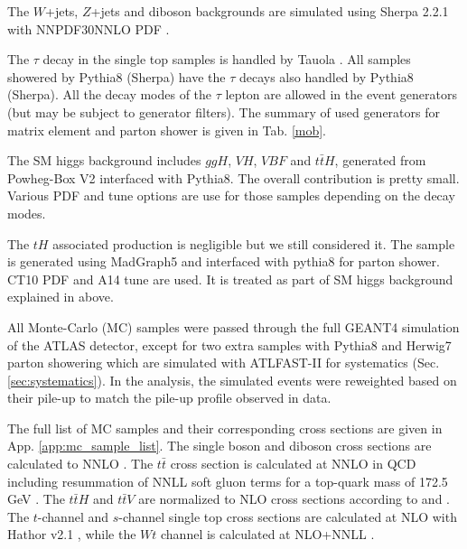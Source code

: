 The $W$+jets, $Z$+jets and diboson backgrounds are simulated using Sherpa 2.2.1 \cite{Sherpa} with NNPDF30NNLO PDF \cite{NNPDF30NLO}.

The $\tau$ decay in the single top samples is handled by Tauola \cite{Tauola}. All samples showered by Pythia8 (Sherpa) have the $\tau$ decays also handled by Pythia8 (Sherpa). All the decay modes of the $\tau$ lepton are allowed in the event generators (but may be subject to generator filters). The summary of used generators for matrix element and parton shower is given in Tab. \ref{mob}.

The SM higgs background includes $ggH$, $VH$, $VBF$ and $t\bar{t}H$, generated from Powheg-Box \cite{Powheg} V2 interfaced with Pythia8. The overall contribution is pretty small. Various PDF and tune options are use for those samples depending on the decay modes.

The $tH$ associated production is negligible but we still considered it. The sample is generated using MadGraph5 and interfaced with pythia8 for parton shower. CT10 PDF and A14 tune are used. It is treated as part of SM higgs background explained in above.

All Monte-Carlo (MC) samples were passed through the full GEANT4 \cite{GEANT4} simulation of the ATLAS detector, except for two extra \ttbar samples with Pythia8 and Herwig7 \cite{Herwig} parton showering which are simulated with ATLFAST-II \cite{AFII} for systematics (Sec. \ref{sec:systematics}). In the analysis, the simulated events were reweighted based on their pile-up to match the pile-up profile observed in data.

The full list of MC samples and their corresponding cross sections are given in App. \ref{app:mc_sample_list}. The single boson and diboson cross sections are calculated to NNLO \cite{bosonXsec}. The $t\bar{t}$ cross section is calculated at NNLO in QCD including resummation of NNLL soft gluon terms for a top-quark mass of 172.5 GeV \cite{ttXsec}. The $t\bar{t}H$ and $t\bar{t}V$ are normalized to NLO cross sections according to \cite{HiggsBR} and \cite{ttVXsec}. The $t$-channel and $s$-channel single top cross sections are calculated at NLO with Hathor v2.1 \cite{Hather1,Hather2}, while the $Wt$ channel is calculated at NLO+NNLL \cite{WtXsec}.

